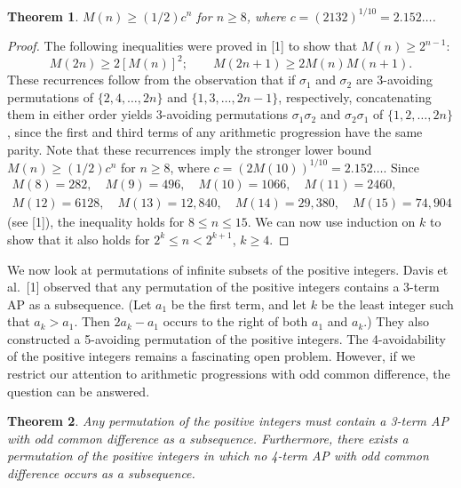 \documentclass[10pt]{article}
\newtheorem{theorem}{Theorem}
\begin{document}
\begin{theorem}
$M(n)\geq (1/2)c^n$ for $n\geq 8$, where
$c=(2132)^{1/10}=2.152\ldots$.
\end{theorem}

\begin{proof}
The following inequalities were proved in [1] to show that
$M(n)\geq 2^{n-1}$:
\[
  M(2n)\geq 2[M(n)]^2;
  \qquad
  M(2n+1)\geq 2M(n)M(n+1).
\]
These recurrences follow from the observation that if $\sigma_1$ and
$\sigma_2$ are 3-avoiding permutations of $\{2,4,\ldots,2n\}$ and
$\{1,3,\ldots,2n-1\}$, respectively, concatenating them in either order
yields 3-avoiding permutations $\sigma_1\sigma_2$ and
$\sigma_2\sigma_1$ of $\{1,2,\ldots,2n\}$, since the first and third terms of
any arithmetic progression have the same parity. Note that these recurrences
imply the stronger lower bound $M(n)\geq (1/2)c^n$ for $n\geq 8$, where
$c=(2M(10))^{1/10}=2.152\ldots$. Since
\[
\begin{gathered}
  M(8)=282,\quad M(9)=496,\quad M(10)=1066,\quad M(11)=2460,\\
  M(12)=6128,\quad M(13)=12{,}840,\quad M(14)=29{,}380,\quad
  M(15)=74{,}904
\end{gathered}
\]
(see [1]), the inequality holds for $8\leq n\leq 15$. We can now use
induction on $k$ to show that it also holds for
$2^k\leq n<2^{k+1}$, $k\geq 4$.
\end{proof}

We now look at permutations of infinite subsets of the positive integers.
Davis et al.\ [1] observed that any permutation of the positive integers
contains a 3-term AP as a subsequence. (Let $a_1$ be the first term, and let
$k$ be the least integer such that $a_k>a_1$. Then $2a_k-a_1$ occurs to the
right of both $a_1$ and $a_k$.) They also constructed a 5-avoiding permutation
of the positive integers. The 4-avoidability of the positive integers remains
a fascinating open problem. However, if we restrict our attention to
arithmetic progressions with odd common difference, the question can be
answered.

\begin{theorem}
Any permutation of the positive integers must contain a 3-term AP with odd
common difference as a subsequence. Furthermore, there exists a permutation
of the positive integers in which no 4-term AP with odd common difference
occurs as a subsequence.
\end{theorem}
\end{document}
